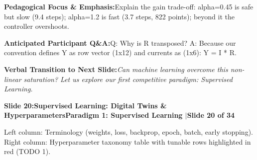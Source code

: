\documentclass[11pt,a4paper]{article}
\begin{document}
\vspace{0.2em}
\begin{tcolorbox}[colback=lightbg,colframe=bordergray,left=6pt,right=6pt,top=3pt,bottom=3pt,boxrule=0.6pt,arc=2.5pt]
\small
\noindent\textbf{\color{navy}Pedagogical Focus \& Emphasis:}\enspace Explain the gain trade-off: alpha=0.45 is safe but slow (9.4 steps); alpha=1.2 is fast (3.7 steps, 822 points); beyond it the controller overshoots.\par\vspace{0.3em}
\noindent\textbf{\color{successgreen}Anticipated Participant Q\&A:}\enspace Q: Why is R transposed? A: Because our convention defines Y as row vector (1x12) and currents as (1x6): Y = I * R.\par\vspace{0.3em}
\noindent\textbf{\color{accent}Verbal Transition to Next Slide:}\enspace \emph{Can machine learning overcome this non-linear saturation? Let us explore our first competitive paradigm: Supervised Learning.}
\end{tcolorbox}
\clearpage
\hypertarget{slide.20}{}
{}
\noindent\begin{tcolorbox}[colback=navy,colframe=navy,left=6pt,right=6pt,top=3pt,bottom=3pt,boxrule=0pt,arc=2pt]
{\large\bfseries\color{white}Slide 20:\enspace Supervised Learning: Digital Twins \& Hyperparameters}\hfill{\footnotesize\bfseries\color{white!85!lightbg}Paradigm 1: Supervised Learning \enspace$|$\enspace Slide 20 of 34}
\end{tcolorbox}
\vspace{0.2em}
\begin{tcolorbox}[colback=lightbg,colframe=bordergray,title={\footnotesize\bfseries\color{darkgray}Slide Visual Blueprint},fontupper=\small,left=6pt,right=6pt,top=2.5pt,bottom=2.5pt,boxrule=0.6pt,arc=2.5pt]
Left column: Terminology (weights, loss, backprop, epoch, batch, early stopping). Right column: Hyperparameter taxonomy table with tunable rows highlighted in red (TODO 1).
\end{tcolorbox}
\vspace{0.2em}
\end{document}
